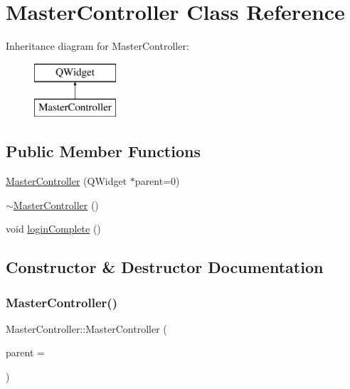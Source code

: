 \hypertarget{class_master_controller}{}\section{Master\+Controller Class Reference}
\label{class_master_controller}
Inheritance diagram for Master\+Controller\+:\begin{figure}[H]
\begin{center}
\leavevmode
\includegraphics[height=2.000000cm]{class_master_controller}
\end{center}
\end{figure}
\subsection*{Public Member Functions}
\begin{DoxyCompactItemize}
\item 
\mbox{\hyperlink{class_master_controller_a4503221125383b917c86863c3e40697b}{Master\+Controller}} (Q\+Widget $\ast$parent=0)
\item 
\mbox{\hyperlink{class_master_controller_a1224d024402d36a61e9bd7b89f434388}{$\sim$\+Master\+Controller}} ()
\item 
void \mbox{\hyperlink{class_master_controller_adb9bf0a49dd9010217c47834a98ec184}{login\+Complete}} ()
\end{DoxyCompactItemize}


\subsection{Constructor \& Destructor Documentation}
\mbox{\label{class_master_controller_a4503221125383b917c86863c3e40697b}} 
\subsubsection{\texorpdfstring{Master\+Controller()}{MasterController()}}
{\footnotesize\ttfamily Master\+Controller\+::\+Master\+Controller (\begin{DoxyParamCaption}\item[{Q\+Widget $\ast$}]{parent = {} }\end{DoxyParamCaption})}

